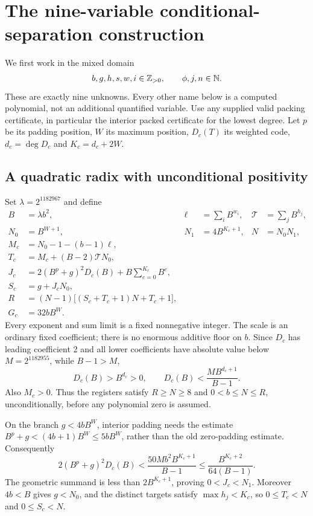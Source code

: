\section{The nine-variable conditional-separation construction}
\label{sec:nine}
We first work in the mixed domain
\[
 b,g,h,s,w,i\in\mathbb Z_{>0},\qquad \phi,j,n\in\mathbb N.
\]
These are exactly nine unknowns. Every other name below is a computed
polynomial, not an additional quantified variable. Use any supplied valid
packing certificate, in particular the interior packed certificate for the
lowest degree. Let $p$ be its padding position, $W$ its maximum position,
$D_c(T)$ its weighted code, $d_c=\deg D_c$ and $K_c=d_c+2W$.

\subsection{A quadratic radix with unconditional positivity}
Set $\lambda=2^{1182967}$ and define
\begin{align*}
 B&=\lambda b^2,&\ell&=\sum_i B^{w_i},&\mathcal T&=\sum_jB^{h_j},\\
 N_0&=B^{W+1},&N_1&=4B^{K_c+1},&N&=N_0N_1,\\
 M_c&=N_0-1-(b-1)\ell,&&&\\
 T_c&=M_c+(B-2)\mathcal T N_0,&&&\\
 J_c&=2(B^p+g)^2D_c(B)+B\sum_{e=0}^{K_c}B^e,&&&\\
 S_c&=g+J_cN_0,&&&\\
 R&=(N-1)\bigl[(S_c+T_c+1)N+T_c+1\bigr],&&&\\
 G_c&=32bB^W.&&&
\end{align*}
Every exponent and sum limit is a fixed nonnegative integer. The scale is
an ordinary fixed coefficient; there is no enormous additive floor on $b$.
Since $D_c$ has leading coefficient 2 and all lower coefficients have
absolute value below $M=2^{1182955}$, while $B-1>M$,
\[
 D_c(B)>B^{d_c}>0,\qquad D_c(B)<\frac{MB^{d_c+1}}{B-1}.
\]
Also $M_c>0$. Thus the registers satisfy $R\ge N\ge8$ and
$0<b\le N\le R$, unconditionally, before any polynomial zero is assumed.

On the branch $g<4bB^W$, interior padding needs the estimate
$B^p+g<(4b+1)B^W\le5bB^W$, rather than the old zero-padding estimate.
Consequently
\[
 2(B^p+g)^2D_c(B)
 <\frac{50Mb^2B^{K_c+1}}{B-1}
 \le\frac{B^{K_c+2}}{64(B-1)}.
\]
The geometric summand is less than $2B^{K_c+1}$, proving $0<J_c<N_1$.
Moreover $4b<B$ gives $g<N_0$, and the distinct targets satisfy
$\max h_j<K_c$, so $0\le T_c<N$ and $0\le S_c<N$.

